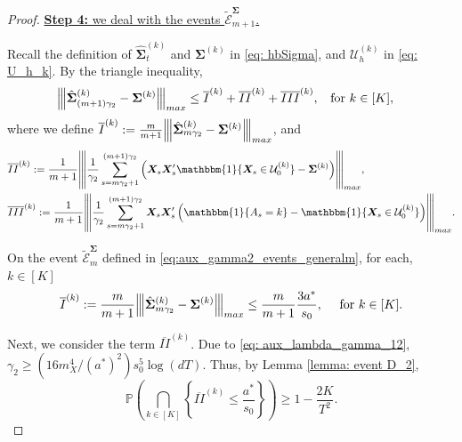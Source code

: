 \documentclass[10pt,a4paper]{amsart}
\newcommand{\Pro}{\mathbb{P}}
\newcommand{\bSigma}{\boldsymbol{\Sigma}}
\newcommand{\bX}{\boldsymbol{X}}
\newcommand{\hbSigma}{\hat{\boldsymbol{\Sigma}}}
\newcommand{\idf}{\mathbbm{1}}
\newcommand{\mE}{\mathcal{E}}
\newcommand{\op}[1]{{\left\vert\kern-0.25ex\left\vert\kern-0.25ex\left\vert #1\right\vert\kern-0.25ex\right\vert\kern-0.25ex\right\vert}}
\begin{document}
\begin{proof}
\medskip
\noindent \underline{\textbf{Step 4:} we deal with the events 
$\tilde{\mE}_{m+1}^{\bSigma}$.}  

Recall the definition of $\hbSigma_{t}^{(k)}$ and $\bSigma^{(k)}$ in \eqref{eq: hbSigma}, and $\mathcal{U}_h^{(k)}$ in \eqref{eq: U_h_k}. By the triangle inequality,
\begin{align}\label{aux:stage3_case_strategy}
    \op{\hbSigma_{(m+1)\gamma_2}^{(k)}-\bSigma^{(k)}}_{\textup{max}}&\le  \overline{I}^{(k)} + \overline{II}^{(k)} + \overline{III}^{(k)},\;\; \text{ for } k \in [K],
\end{align}
where we define $\overline{I}^{(k)} := \frac{m}{m+1} \op{\hbSigma_{m\gamma_2}^{(k)} -\bSigma^{(k)} }_{\textup{max}}$, and
\begin{align*}
&
    \overline{II}^{(k)} :=\frac{1}{m+1}\op{\frac{1}{\gamma_2}\sum_{s=m \gamma_2+1}^{(m+1)\gamma_2} \left(\bX_s\bX_s'\idf\{\bX_s \in\mathcal{U}_0^{(k)}\}-\bSigma^{(k)}\right)}_{\textup{max}},\\
    &\overline{III}^{(k)} := \frac{1}{m+1} \op{\frac{1}{\gamma_2}\sum_{s=m \gamma_2+1}^{(m+1)\gamma_2}\bX_s\bX_s'\left(\idf\{A_s=k\}-\idf\{\bX_s \in \mathcal{U}_0^{(k)}\}\right)}_{\textup{max}}.
\end{align*}

On the event $\tilde{\mE}_m^{\bSigma}$ defined in \eqref{eq:aux_gamma2_events_generalm}, for each, $k\in[K]$
\begin{equation} \label{aux:stage3_I}
  \overline{I}^{(k)} := \frac{m}{m+1} \op{\hbSigma_{m\gamma_2}^{(k)} -\bSigma^{(k)} }_{\textup{max}} \leq   \frac{m}{m+1}  \frac{3 a^*}{s_0}, \quad \text{ for } k \in [K].
\end{equation}

Next, we consider the term $\overline{II}^{(k)}$. Due to \eqref{eq: aux_lambda_gamma_12}, $\gamma_2  \geq (16m_X^4/(a^*)^2) s_0^5 \log(dT)$. Thus,  by  Lemma \ref{lemma: event D_2},
\begin{equation}\label{aux:stage3_II}
   \Pro\left( \bigcap_{k \in [K]} \left\{ \overline{II}^{(k)}  \le \frac{a^*}{s_0}\right\} \right) \geq 1 -\frac{2K}{T^2}.
\end{equation}


\end{proof}
\end{document}
